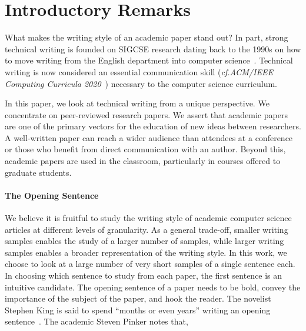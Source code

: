 \documentclass[sigconf,anonymous]{acmart}
\newcommand{\cf}{\textit{cf.}\xspace}
\begin{document}



\maketitle

\section{Introductory Remarks}

What makes the writing style of an academic paper stand out? In part, strong technical writing is founded on SIGCSE research dating back to the 1990s on how to move writing from the English department into computer science~\cite{Pes91,TP93,FPC96,Kay98}. Technical writing is now considered an essential communication skill (\cf \textit{ACM/IEEE Computing Curricula 2020}~\cite{CC2020,CC2020report}) necessary to the computer science curriculum.

In this paper, we look at technical writing from a unique perspective. We concentrate on peer-reviewed research papers. We assert that academic papers are one of the primary vectors for the education of new ideas between researchers. A well-written paper can reach a wider audience than attendees at a conference or those who benefit from direct communication with an author. Beyond this, academic papers are used in the classroom, particularly in courses offered to graduate students.

\paragraph{The Opening Sentence}

We believe it is fruitful to study the writing style of academic computer science articles at different levels of granularity. As a general trade-off, smaller writing samples enables the study of a larger number of samples, while larger writing samples enables a broader representation of the writing style. In this work, we choose to look at a large number of very short samples of a single sentence each. In choosing which sentence to study from each paper, the first sentence is an intuitive candidate. The opening sentence of a paper needs to be bold, convey the importance of the subject of the paper, and hook the reader. The novelist Stephen King is said to spend ``months or even years'' writing an opening sentence~\cite{Fas13}. The academic Steven Pinker notes that,
\end{document}
